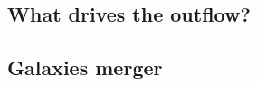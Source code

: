 \documentclass[../main.tex]{subfiles}
\begin{document}
	\subsection{What drives the outflow?}
	
	\subsection{Galaxies merger}
	
\end{document}
